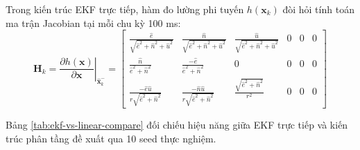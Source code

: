 Trong kiến trúc EKF trực tiếp, hàm đo lường phi tuyến $h(\mathbf{x}_k)$ đòi hỏi tính toán ma trận Jacobian tại mỗi chu kỳ 100 ms:
\begin{equation}
\mathbf{H}_k = \left. \frac{\partial h(\mathbf{x})}{\partial \mathbf{x}} \right|_{\hat{\mathbf{x}}_k^-} = \begin{bmatrix}
\frac{\hat{e}}{\sqrt{\hat{e}^2 + \hat{n}^2 + \hat{u}^2}} & \frac{\hat{n}}{\sqrt{\hat{e}^2 + \hat{n}^2 + \hat{u}^2}} & \frac{\hat{u}}{\sqrt{\hat{e}^2 + \hat{n}^2 + \hat{u}^2}} & 0 & 0 & 0 \\
\frac{\hat{n}}{\hat{e}^2 + \hat{n}^2} & \frac{-\hat{e}}{\hat{e}^2 + \hat{n}^2} & 0 & 0 & 0 & 0 \\
\frac{-\hat{e}\hat{u}}{r \sqrt{\hat{e}^2 + \hat{n}^2}} & \frac{-\hat{n}\hat{u}}{r \sqrt{\hat{e}^2 + \hat{n}^2}} & \frac{\sqrt{\hat{e}^2 + \hat{n}^2}}{r^2} & 0 & 0 & 0
\end{bmatrix}
\label{eq:ekf-jacobian}
\end{equation}

Bảng \ref{tab:ekf-vs-linear-compare} đối chiếu hiệu năng giữa EKF trực tiếp và kiến trúc phân tầng đề xuất qua 10 seed thực nghiệm.

\begin{table}[H]
\centering
\caption{Đối chiếu hiệu năng giữa EKF trực tiếp và Bộ lọc phân tầng ENU đề xuất}
\label{tab:ekf-vs-linear-compare}
\end{table}

